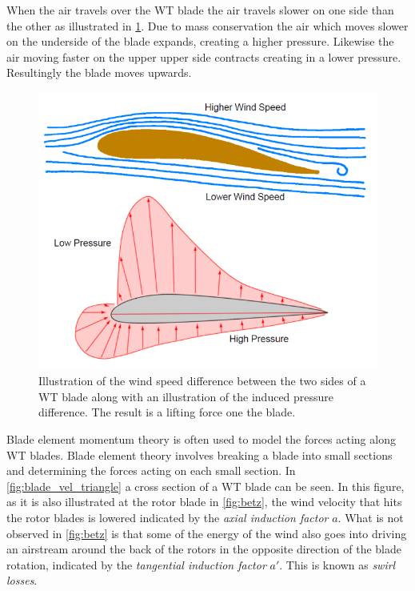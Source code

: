 When the air travels over the WT blade the air travels slower on one side than the other as illustrated in \cref{fig:airfoil}. Due to mass conservation the air which moves slower on the underside of the blade expands, creating a higher pressure. Likewise the air moving faster on the upper upper side contracts creating in a lower pressure. Resultingly the blade moves upwards.
\begin{figure}[h]
	\centering
	\includegraphics[width=0.5\linewidth]{Graphics/AirfoilAirflow.png}
	\caption{Illustration of the wind speed difference between the two sides of a WT blade along with an illustration of the induced pressure difference. The result is a lifting force one the blade.}
	\label{fig:airfoil}
\end{figure}
Blade element momentum theory is often used to model the forces acting along WT blades. Blade element theory involves breaking a blade into small sections and determining the forces acting on each small section. In \cref{fig:blade_vel_triangle} a cross section of a WT blade can be seen. In this figure, as it is also illustrated at the rotor blade in \cref{fig:betz}, the wind velocity that hits the rotor blades is lowered indicated by the \textit{axial induction factor} $ a $. What is not observed in \cref{fig:betz} is that some of the energy of the wind also goes into driving an airstream around the back of the rotors in the opposite direction of the blade rotation, indicated by the \textit{tangential induction factor} $ a' $. This is known as \textit{swirl losses}.

%	


